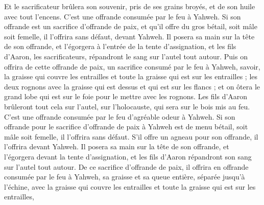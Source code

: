 \begin{multicols}{2}
Et le sacrificateur brûlera son souvenir, pris de ses grains broyés, et de son huile avec tout l'encens. C'est une offrande consumée par le feu à Yahweh.
\VerseOne{}Si son offrande est un sacrifice d'offrande de paix, et qu'il offre du gros bétail, soit mâle soit femelle, il l'offrira sans défaut, devant Yahweh.
Il posera sa main sur la tête de son offrande, et l'égorgera à l'entrée de la tente d'assignation, et les fils d'Aaron, les sacrificateurs, répandront le sang sur l'autel tout autour.
Puis on offrira de cette offrande de paix, un sacrifice consumé par le feu à Yahweh, savoir, la graisse qui couvre les entrailles et toute la graisse qui est sur les entrailles ;
les deux rognons avec la graisse qui est dessus et qui est sur les flancs ; et on ôtera le grand lobe qui est sur le foie pour le mettre avec les rognons.
Les fils d'Aaron brûleront tout cela sur l'autel, sur l'holocauste, qui sera sur le bois mis au feu. C'est une offrande consumée par le feu d'agréable odeur à Yahweh.
Si son offrande pour le sacrifice d'offrande de paix à Yahweh est de menu bétail, soit mâle soit femelle, il l'offrira sans défaut.
S'il offre un agneau pour son offrande, il l'offrira devant Yahweh.
Il posera sa main sur la tête de son offrande, et l'égorgera devant la tente d'assignation, et les fils d'Aaron répandront son sang sur l'autel tout autour.
De ce sacrifice d'offrande de paix, il offrira en offrande consumée par le feu à Yahweh, sa graisse et sa queue entière, séparée jusqu'à l'échine, avec la graisse qui couvre les entrailles et toute la graisse qui est sur les entrailles,

\end{multicols}
